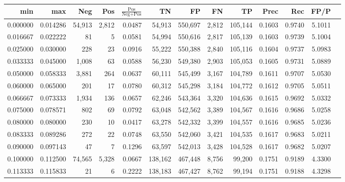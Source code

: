 \begin{tabular}{rrrrrrrrrrrrr}
\toprule
     min &      max &    Neg &    Pos & $\frac{\text{Pos}}{\text{Neg}+\text{Pos}}$ &      TN &      FP &      FN &      TP &   Prec &    Rec &   FP/P \\
\midrule
0.000000 & 0.014286 & 54,913 &  2,812 &                                     0.0487 &  54,913 & 550,697 &   2,812 & 105,144 & 0.1603 & 0.9740 & 5.1011 \\
0.016667 & 0.022222 &     81 &      5 &                                     0.0581 &  54,994 & 550,616 &   2,817 & 105,139 & 0.1603 & 0.9739 & 5.1004 \\
0.025000 & 0.030000 &    228 &     23 &                                     0.0916 &  55,222 & 550,388 &   2,840 & 105,116 & 0.1604 & 0.9737 & 5.0983 \\
0.033333 & 0.045000 &  1,008 &     63 &                                     0.0588 &  56,230 & 549,380 &   2,903 & 105,053 & 0.1605 & 0.9731 & 5.0889 \\
0.050000 & 0.058333 &  3,881 &    264 &                                     0.0637 &  60,111 & 545,499 &   3,167 & 104,789 & 0.1611 & 0.9707 & 5.0530 \\
0.060000 & 0.065000 &    201 &     17 &                                     0.0780 &  60,312 & 545,298 &   3,184 & 104,772 & 0.1612 & 0.9705 & 5.0511 \\
0.066667 & 0.073333 &  1,934 &    136 &                                     0.0657 &  62,246 & 543,364 &   3,320 & 104,636 & 0.1615 & 0.9692 & 5.0332 \\
0.075000 & 0.078571 &    802 &     69 &                                     0.0792 &  63,048 & 542,562 &   3,389 & 104,567 & 0.1616 & 0.9686 & 5.0258 \\
0.080000 & 0.080000 &    230 &     10 &                                     0.0417 &  63,278 & 542,332 &   3,399 & 104,557 & 0.1616 & 0.9685 & 5.0236 \\
0.083333 & 0.089286 &    272 &     22 &                                     0.0748 &  63,550 & 542,060 &   3,421 & 104,535 & 0.1617 & 0.9683 & 5.0211 \\
0.090000 & 0.097143 &     47 &      7 &                                     0.1296 &  63,597 & 542,013 &   3,428 & 104,528 & 0.1617 & 0.9682 & 5.0207 \\
0.100000 & 0.112500 & 74,565 &  5,328 &                                     0.0667 & 138,162 & 467,448 &   8,756 &  99,200 & 0.1751 & 0.9189 & 4.3300 \\
0.113333 & 0.115833 &     21 &      6 &                                     0.2222 & 138,183 & 467,427 &   8,762 &  99,194 & 0.1751 & 0.9188 & 4.3298 \\

\end{tabular}

